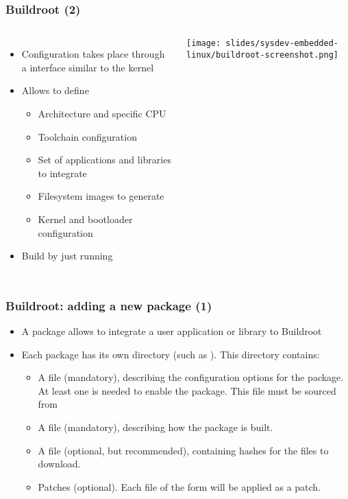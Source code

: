 \begin{frame}
  \frametitle{Buildroot (2)}
  \begin{columns}
    \begin{itemize}
    \item Configuration takes place through a  interface similar to the
      kernel\\
    \item Allows to define
      \begin{itemize}
      \item Architecture and specific CPU
      \item Toolchain configuration
      \item Set of applications and libraries to integrate
      \item Filesystem images to generate
      \item Kernel and bootloader configuration
      \end{itemize}
    \item Build by just running\\
    \end{itemize}
    \texttt{[image: slides/sysdev-embedded-linux/buildroot-screenshot.png]}
  \end{columns}
\end{frame}

\begin{frame}
  \frametitle{Buildroot: adding a new package (1)}
  \begin{itemize}
  \item A package allows to integrate a user application or library to
    Buildroot
  \item Each package has its own directory (such as
    ). This directory contains:
    \begin{itemize}
    \item A  file (mandatory), describing the
      configuration options for the package. At least one is needed to
      enable the package. This file must be sourced from
    \item A  file (mandatory), describing how the
      package is built.
    \item A  file (optional, but recommended), containing
      hashes for the files to download.
    \item Patches (optional). Each file of the form
       will be applied as a patch.
    \end{itemize}
  \end{itemize}
\end{frame}


